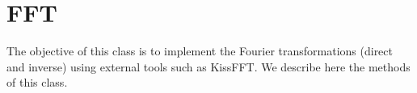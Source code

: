 

\newpage\section{FFT}

The objective of this class is to implement the Fourier transformations (direct and inverse) using external tools such as KissFFT.
We describe here the methods of this class.

